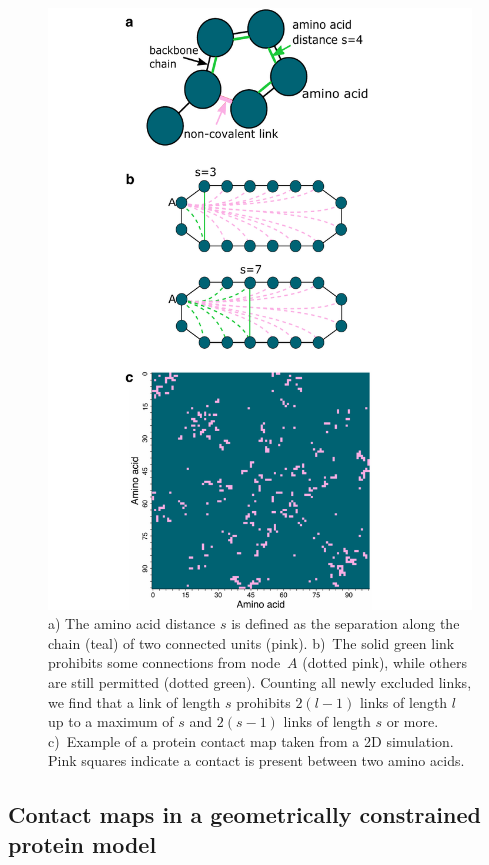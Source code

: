\documentclass[
reprint,
twocolumn,
amsmath,amssymb,superscriptaddress,aps,
pre]{revtex4-1}
\begin{document}
\begin{figure}[h!]
    \centering
    \includegraphics[width=0.8\columnwidth]{figures/Fig1/Fig1.pdf}
    \caption{a) The amino acid distance $s$ is defined as the separation along the chain (teal) of two connected units (pink). b)~The solid green link prohibits some connections from node~$A$ (dotted pink), while others are still permitted (dotted green). Counting all newly excluded links, we find that a link of length $s$ prohibits $2(l-1)$ links of length $l$ up to a maximum of $s$ and $2(s-1)$ links of length $s$ or more. c)~Example of a protein contact map taken from a 2D simulation. Pink squares indicate a contact is present between two amino acids.}
    \label{fig:schematic}
\end{figure}

\subsection{Contact maps in a geometrically constrained protein model}
\end{document}
